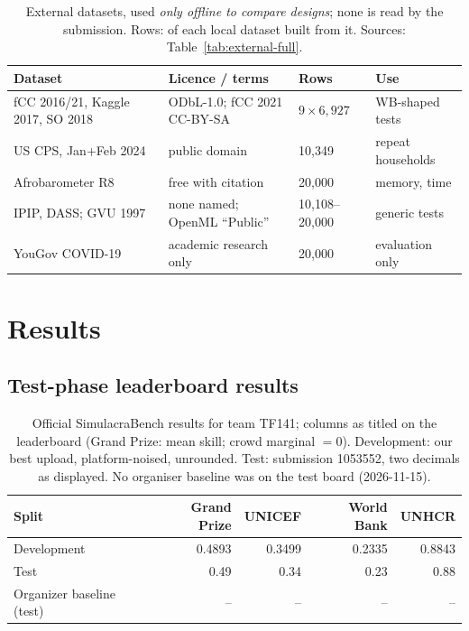 \documentclass{article}
\newcommand{\teamid}{TF141}
\begin{document}
\begin{table}[h]
  \centering
  \footnotesize
  \caption{External datasets, used \emph{only offline to compare designs}; none is read by the submission. Rows: of each local dataset built from it. Sources: Table~\ref{tab:external-full}.}
  \label{tab:external}
  \setlength{\tabcolsep}{4pt}
  \begin{tabular}{@{}llll@{}}
    \toprule
    Dataset & Licence / terms & Rows & Use \\
    \midrule
    fCC 2016/21, Kaggle 2017, SO 2018 & ODbL-1.0; fCC 2021 CC-BY-SA & $9\times6{,}927$ & WB-shaped tests \\
    US CPS, Jan+Feb 2024 & public domain & 10,349 & repeat households \\
    Afrobarometer R8 & free with citation & 20,000 & memory, time \\
    IPIP, DASS; GVU 1997 & none named; OpenML ``Public'' & 10,108--20,000 & generic tests \\
    YouGov COVID-19 & academic research only & 20,000 & evaluation only \\
    \bottomrule
  \end{tabular}
\end{table}

\section{Results}
\label{sec:results}

\subsection{Test-phase leaderboard results}
\begin{table}[h]
  \centering
  \small
  \caption{Official SimulacraBench results for team \teamid{}; columns as titled on the leaderboard (Grand Prize: mean skill; crowd marginal $=0$). Development: our best upload, platform-noised, unrounded. Test: submission 1053552, two decimals as displayed. No organiser baseline was on the test board (2026-11-15).}
  \label{tab:results}
  \begin{tabular}{lrrrr}
    \toprule
    Split & Grand Prize & UNICEF & World Bank & UNHCR \\
    \midrule
    Development & 0.4893 & 0.3499 & 0.2335 & 0.8843 \\
    Test        & 0.49 & 0.34 & 0.23 & 0.88 \\
    Organizer baseline (test) & -- & -- & -- & -- \\
    \bottomrule
  \end{tabular}
\end{table}
\end{document}
